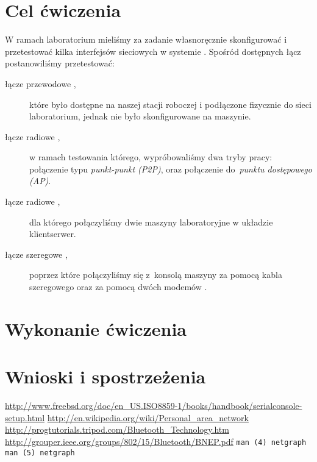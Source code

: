 \documentclass[a4paper,11pt,notitlepage]{article}
\begin{document}

\maketitle
\tableofcontents


\section{Cel ćwiczenia}

W ramach laboratorium mieliśmy za zadanie własnoręcznie skonfigurować i
przetestować kilka interfejsów sieciowych w systemie \bsd. Spośród dostępnych
łącz postanowiliśmy przetestować:

\begin{description}
    \item[łącze przewodowe \eth\textnormal{,}] które było dostępne na naszej
    stacji roboczej i podłączone fizycznie do sieci laboratorium, jednak nie
    było skonfigurowane na maszynie.
    \item[łącze radiowe \wifi\textnormal{,}] w ramach testowania którego,
    wypróbowaliśmy dwa tryby pracy: połączenie typu \emph{punkt-punkt (P2P)},
    oraz połączenie do~\emph{punktu dostępowego (AP)}.
    \item[łącze radiowe \bt\textnormal{,}] dla którego połączyliśmy dwie
    maszyny laboratoryjne w układzie klient\dywiz serwer.
    \item[łącze szeregowe \rs\textnormal{,}] poprzez które połączyliśmy się
    z~konsolą maszyny \zielone{} za pomocą kabla szeregowego oraz za pomocą
    dwóch modemów \bt.
\end{description}


\section{Wykonanie ćwiczenia}






\section{Wnioski i spostrzeżenia}


\begin{thebibliography}{9}
        \url{http://www.freebsd.org/doc/en_US.ISO8859-1/books/handbook/serialconsole-setup.html}
        \url{http://en.wikipedia.org/wiki/Personal_area_network}
        \url{http://progtutorials.tripod.com/Bluetooth_Technology.htm}
        \url{http://grouper.ieee.org/groups/802/15/Bluetooth/BNEP.pdf}
        {\texttt{man (4) netgraph}}
        {\texttt{man (5) netgraph}}
\end{thebibliography}
\end{document}
